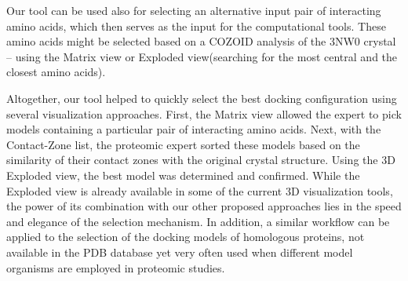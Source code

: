 \documentclass{bmcart}
\def\ExpView {Exploded view\xspace}
\def\MatView {Matrix view\xspace}
\def\CoZoList{Contact-Zone list\xspace}
\begin{document}
Our tool can be used also for selecting an alternative input pair of interacting amino acids, which then serves as the input for the computational tools.
These amino acids might be selected based on a COZOID analysis of the 3NW0 crystal -- using the \MatView or \ExpView (searching for the most central and the closest amino acids).

Altogether, our tool helped to quickly select the best docking configuration using several visualization approaches. 
First, the \MatView allowed the expert to pick models containing a particular pair of interacting amino acids. 
Next, with the \CoZoList, the proteomic expert sorted these models based on the similarity of their contact zones with the original crystal structure. 
Using the 3D \ExpView, the best model was determined and confirmed. 
While the Exploded view is already available in some of the current 3D visualization tools, the power of its combination with our other proposed approaches lies in the speed and elegance of the selection mechanism. 
In addition, a similar workflow can be applied to the selection of the docking models of homologous proteins, not available in the PDB database yet very often used when different model organisms are employed in proteomic studies.





\end{document}
